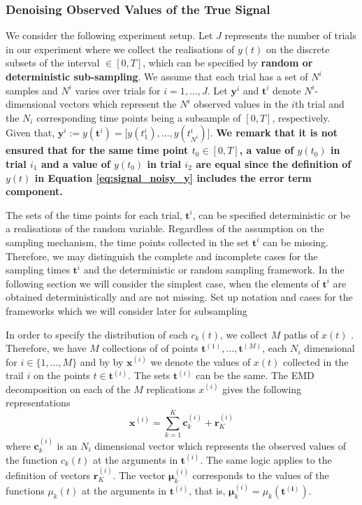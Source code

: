 \subsubsection{Denoising Observed Values of the True Signal}
We consider the following experiment setup. Let $J$ represents the number of trials in our experiment where we collect the realisations of $y(t)$ on the discrete subsets of the interval $ \in [0,T]$, which can be specified by \textbf{random or deterministic sub-sampling}. We assume that each trial has a set of $N^i$ samples and $N^i$ varies over trials for $i = 1,\ldots, J$. Let  $\mathbf{y}^{i}$ and $\mathbf{t}^i$ denote $N^i$-dimensional vectors which represent the $N^i$ observed values in the $i$th trial and the $N_i$ corresponding time points being a subsample of $[0,T]$, respectively. Given that, $\mathbf{y}^{i} := y(\mathbf{t}^i) = \big[y(t_1^i), \ldots, y(t_{N^i}^i) \big]$. \textbf{We remark that it is not ensured that for the same time point $t_0\in [0,T]$, a value of $y(t_0)$ in trial $i_1$ and a value of $y(t_0)$ in trial $i_2$ are equal since the definition of $y(t)$ in Equation \eqref{eq:signal_noisy_y} includes the error term component.}


The sets of the time points for each trial, $\mathbf{t}^i$, can be specified deterministic or be a realisations of the random variable. Regardless of the assumption on the sampling mechanism, the time points collected in the set $\mathbf{t}^i$ can be missing. Therefore, we may distinguish the complete and incomplete cases for the sampling times $\mathbf{t}^i$ and the deterministic or random sampling framework. In the following section we will consider the simplest case, when the elements of  $\mathbf{t}^i$  are obtained deterministically and are not missing. {\color{red} Set up notation and cases for the frameworks which we will consider later for subsampling}


In order to specify the distribution of each $c_k(t)$, we collect $M$ paths of $x(t)$ . Therefore, we have $M$ collections of of points $\mathbf{t}^{(1)} , \ldots, \mathbf{t}^{(M)}$, each $N_i$ dimensional for $i \in \Big\{1,\ldots,M\Big\}$ and by  by $\mathbf{x}^{(i)}$ we denote the values of $x(t)$ collected in the trail $i$ on the points $t \in \mathbf{t}^{(i)}$.  The sets $\mathbf{t}^{(i)}$ can be the same.
The EMD decomposition on each of the $M$ replications  $x^{(i)}$ gives the following representations
\begin{equation}
\mathbf{x}^{(i)} = \sum_{k = 1}^K \mathbf{c}_k^{(i)}+ \mathbf{r}^{(i)}_K 
\end{equation}
where $\mathbf{c}_k^{(i)}$ is an $N_i$ dimensional vector which represents the observed values of the function $c_k(t)$ at the arguments in $\mathbf{t}^{(i)}$. The same logic applies to the definition of vectors $\mathbf{r}^{(i)}_K $. The vector $\bm{\mu}_k^{(i)}$  corresponds to the values of the functions $\mu_k(t)$ at the arguments in $\mathbf{t}^{(i)}$, that is, $\bm{\mu}_k^{(i)} = \mu_k(\mathbf{\mathbf{t}^{(i)}})$.

